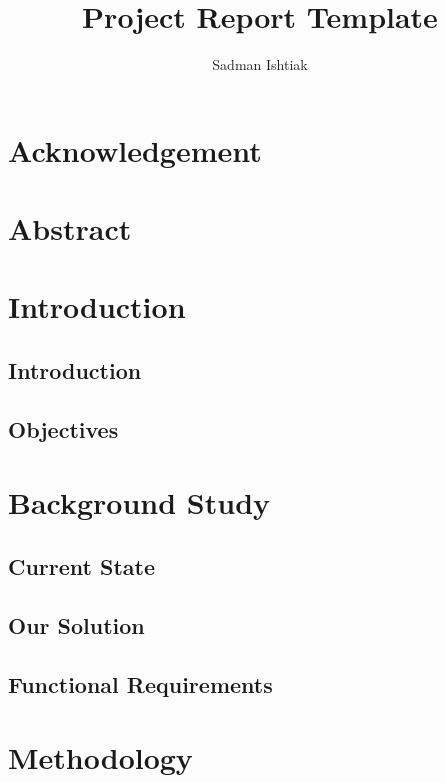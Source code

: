 \documentclass[a4paper, 12pt, openany]{report}
\title{Project Report Template}
\author{Sadman Ishtiak}
\begin{document}
	\let\cleardoublepage\clearpage
	\maketitle
	
	\setcounter{secnumdepth}{1}
	\setcounter{tocdepth}{1}
	\tableofcontents
	
	\clearpage
	
	\chapter*{Acknowledgement}
	
	\chapter*{Abstract}
	
	\chapter{Introduction}
	\section{Introduction}
	\section{Objectives}
	
	\chapter{Background Study}
	\section{Current State}
	\section{Our Solution}
	\section{Functional Requirements}
	
	\chapter{Methodology}
\end{document}
